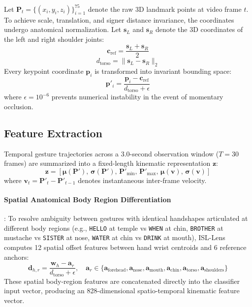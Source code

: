 Let $\mathbf{P}_t = \{ (x_i, y_i, z_i) \}_{i=1}^{75}$ denote the raw 3D landmark points at video frame $t$. To achieve scale, translation, and signer distance invariance, the coordinates undergo anatomical normalization. Let $\mathbf{s}_L$ and $\mathbf{s}_R$ denote the 3D coordinates of the left and right shoulder joints:
\begin{equation}
    \mathbf{c}_{\text{ref}} = \frac{\mathbf{s}_L + \mathbf{s}_R}{2}
\end{equation}
\begin{equation}
    d_{\text{torso}} = \|\mathbf{s}_L - \mathbf{s}_R\|_2
\end{equation}
Every keypoint coordinate $\mathbf{p}_i$ is transformed into invariant bounding space:
\begin{equation}
    \mathbf{p}'_i = \frac{\mathbf{p}_i - \mathbf{c}_{\text{ref}}}{d_{\text{torso}} + \epsilon}
\end{equation}
where $\epsilon = 10^{-6}$ prevents numerical instability in the event of momentary occlusion.

\subsection{Feature Extraction}
Temporal gesture trajectories across a 3.0-second observation window ($T = 30$ frames) are summarized into a fixed-length kinematic representation $\mathbf{z}$:
\begin{equation}
    \mathbf{z} = \left[ \boldsymbol{\mu}(\mathbf{P}'), \, \boldsymbol{\sigma}(\mathbf{P}'), \, \mathbf{P}'_{\min}, \, \mathbf{P}'_{\max}, \, \boldsymbol{\mu}(\mathbf{v}), \, \boldsymbol{\sigma}(\mathbf{v}) \right]
\end{equation}
where $\mathbf{v}_t = \mathbf{P}'_t - \mathbf{P}'_{t-1}$ denotes instantaneous inter-frame velocity.

\paragraph{Spatial Anatomical Body Region Differentiation}:
To resolve ambiguity between gestures with identical handshapes articulated at different body regions (e.g., \texttt{HELLO} at temple vs \texttt{WHEN} at chin, \texttt{BROTHER} at mustache vs \texttt{SISTER} at nose, \texttt{WATER} at chin vs \texttt{DRINK} at mouth), ISL-Lens computes 12 spatial offset features between hand wrist centroids and 6 reference anchors:
\begin{equation}
    \mathbf{d}_{h, r} = \frac{\mathbf{w}_h - \mathbf{a}_r}{d_{\text{torso}} + \epsilon}, \quad \mathbf{a}_r \in \{\mathbf{a}_{\text{forehead}}, \mathbf{a}_{\text{nose}}, \mathbf{a}_{\text{mouth}}, \mathbf{a}_{\text{chin}}, \mathbf{a}_{\text{torso}}, \mathbf{a}_{\text{shoulders}}\}
\end{equation}
These spatial body-region features are concatenated directly into the classifier input vector, producing an 828-dimensional spatio-temporal kinematic feature vector.

